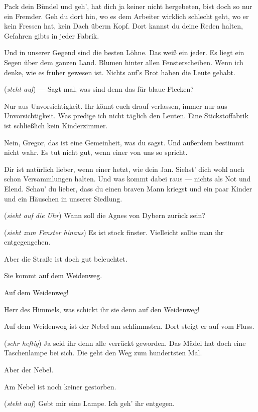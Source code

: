 \documentclass[
	final,
	a4paper,
	ngerman,
	mpinclude = true, %
	twoside = true,
	open = right,
	cleardoublepage = plain,
	DIV = 13,
	BCOR = 1cm,
	titlepage = firstiscover,
	]{scrbook}
\newcommand{\direction}[1]{(\textit{#1})}
\newcommand{\thecharacter}[1]{\textup{\textsc{#1}}\xspace}
\newcommand{\theBarbara}{\thecharacter{Barbara}}
\newcommand{\theJosef}{\thecharacter{Josef}}
\newcommand{\theGregor}{\thecharacter{Gregor}}
\newcommand{\theJan}{\thecharacter{Jan}}
\newcommand{\theAndreas}{\thecharacter{Andreas}}
\newcommand{\theLuise}{\thecharacter{Luise}}
\newcommand{\character}[1]{\item[#1]}
\newcommand{\Barbara}{\character{\theBarbara}}
\newcommand{\Josef}{\character{\theJosef}}
\newcommand{\Gregor}{\character{\theGregor}}
\newcommand{\Jan}{\character{\theJan}}
\newcommand{\Andreas}{\character{\theAndreas}}
\newcommand{\Luise}{\character{\theLuise}}
\begin{document}
\begin{play}
\Gregor
Pack dein Bündel und geh', hat dich ja keiner nicht hergebeten, bist doch so nur ein Fremder. Geh du dort hin, wo es dem Arbeiter wirklich schlecht geht, wo er kein Fressen hat, kein Dach überm Kopf. Dort kannst du deine Reden halten, Gefahren gibts in jeder Fabrik.

\Josef
Und in unserer Gegend sind die besten Löhne. Das weiß ein jeder. Es liegt ein Segen über dem ganzen Land. Blumen hinter allen Fensterscheiben. Wenn ich denke, wie es früher gewesen ist. Nichts auf's Brot haben die Leute gehabt.

\Barbara
\direction{steht auf} --- Sagt mal, was sind denn das für blaue Flecken?

\Gregor
Nur aus Unvorsichtigkeit. Ihr könnt euch drauf verlassen, immer nur aus Unvorsichtigkeit. Was predige ich nicht täglich den Leuten. Eine Stickstoffabrik ist schließlich kein Kinderzimmer.

\Luise
Nein, Gregor, das ist eine Gemeinheit, was du sagst. Und außerdem bestimmt nicht wahr. Es tut nicht gut, wenn einer von uns so spricht.

\Gregor
Dir ist natürlich lieber, wenn einer hetzt, wie dein Jan. Siehst' dich wohl auch schon Versammlungen halten. Und was kommt dabei raus --- nichts als Not und Elend. Schau' du lieber, dass du einen braven Mann kriegst und ein paar Kinder und ein Häuschen in unserer Siedlung.

\Andreas
\direction{sieht auf die Uhr} Wann soll die Agnes von Dybern zurück sein?

\Josef
\direction{sieht zum Fenster hinaus} Es ist stock finster. Vielleicht sollte man ihr entgegengehen.

\Luise
Aber die Straße ist doch gut beleuchtet.

\Barbara
Sie kommt auf dem Weidenweg.

\Andreas
Auf dem Weidenweg!

\Jan
Herr des Himmels, was schickt ihr sie denn auf den Weidenweg!

\Gregor
Auf dem Weidenwog ist der Nebel am schlimmsten. Dort steigt er auf vom Fluss.

\Barbara
\direction{sehr heftig} Ja seid ihr denn alle verrückt geworden. Das Mädel hat doch eine Taschenlampe bei sich. Die geht den Weg zum hundertsten Mal.

\Luise
Aber der Nebel.

\Barbara
Am Nebel ist noch keiner gestorben.

\Andreas
\direction{steht auf} Gebt mir eine Lampe. Ich geh' ihr entgegen.


\end{play}
\end{document}
